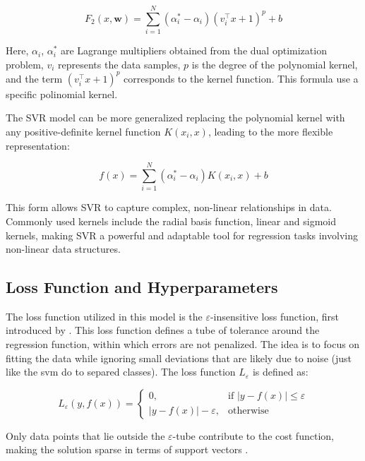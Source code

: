 \documentclass[8pt,twocolumn]{article}
\begin{document}
\begin{equation}
F_2(x, \mathbf{w}) = \sum_{i=1}^{N} (\alpha_i^* - \alpha_i) (v_i^\top x + 1)^p + b
\end{equation}

Here, $\alpha_i$, $\alpha_i^*$ are Lagrange multipliers obtained from the dual optimization problem, $v_i$ represents the data samples, $p$ is the degree of the polynomial kernel, and the term $(v_i^\top x + 1)^p$ corresponds to the kernel function. This formula use a specific polinomial kernel.

The SVR model can be more generalized replacing the polynomial kernel with any positive-definite kernel function $K(x_i, x)$, leading to the more flexible representation:

\begin{equation}
f(x) = \sum_{i=1}^{N} (\alpha_i^* - \alpha_i) K(x_i, x) + b
\end{equation}

This form allows SVR to capture complex, non-linear relationships in data. Commonly used kernels include the radial basis function, linear and sigmoid kernels, making SVR a powerful and adaptable tool for regression tasks involving non-linear data structures.

\subsection{Loss Function and Hyperparameters}
The loss function utilized in this model is the $\varepsilon$-insensitive loss function, first introduced by \citet{vapnik1995nature}. This loss function defines a tube of tolerance around the regression function, within which errors are not penalized. The idea is to focus on fitting the data while ignoring small deviations that are likely due to noise (just like the svm do to separed classes). The loss function $L_\varepsilon$ is defined as:

\begin{equation}
L_\varepsilon(y, f(x)) = 
\begin{cases}
0, & \text{if } |y - f(x)| \leq \varepsilon \\
|y - f(x)| - \varepsilon, & \text{otherwise}
\end{cases}
\end{equation}

Only data points that lie outside the $\varepsilon$-tube contribute to the cost function, making the solution sparse in terms of support vectors \citep{smola1998tutorial}.
\end{document}
